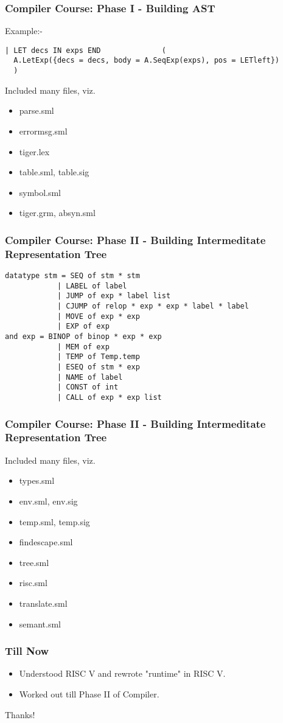 \documentclass{beamer}
\begin{document}
\begin{frame}[fragile]
  \frametitle{Compiler Course: Phase I - Building AST}
  Example:-
  \begin{verbatim}
| LET decs IN exps END              (
  A.LetExp({decs = decs, body = A.SeqExp(exps), pos = LETleft})
  )
  \end{verbatim}
  Included many files, viz. 
  \begin{itemize}
    \item parse.sml 
    \item errormsg.sml 
    \item tiger.lex 
    \item table.sml, table.sig 
    \item symbol.sml 
    \item tiger.grm, absyn.sml 
  \end{itemize}
\end{frame}

\begin{frame}[fragile]
  \frametitle{Compiler Course: Phase II - Building Intermeditate Representation Tree}
  \begin{verbatim}
datatype stm = SEQ of stm * stm 
            | LABEL of label 
            | JUMP of exp * label list 
            | CJUMP of relop * exp * exp * label * label 
            | MOVE of exp * exp 
            | EXP of exp 
and exp = BINOP of binop * exp * exp 
            | MEM of exp 
            | TEMP of Temp.temp 
            | ESEQ of stm * exp 
            | NAME of label 
            | CONST of int 
            | CALL of exp * exp list 
  \end{verbatim}
  
\end{frame}
\begin{frame}[fragile]
  \frametitle{Compiler Course: Phase II - Building Intermeditate Representation Tree}
  Included many files, viz. 
  \begin{itemize}
    \item types.sml 
    \item env.sml, env.sig 
    \item temp.sml, temp.sig 
    \item findescape.sml 
    \item tree.sml 
    \item risc.sml 
    \item translate.sml 
    \item semant.sml 
  \end{itemize}
\end{frame}

\begin{frame}[fragile]
  \frametitle{Till Now}
  \begin{itemize}
    \item Understood RISC V and rewrote "runtime" in RISC V. 
    \pause
    \item Worked out till Phase II of Compiler.
  \end{itemize}
\end{frame}
\begin{frame}[standout]
Thanks!
\end{frame}   
\end{document}
